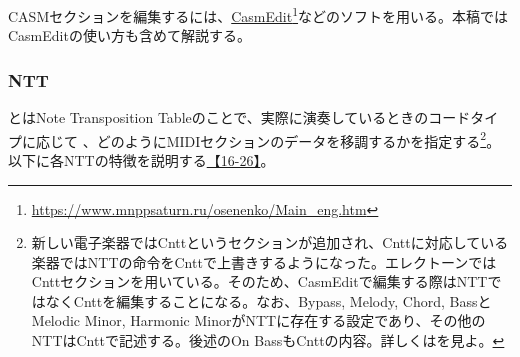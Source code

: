 \documentclass[uplatex, 10pt, dvipdfmx]{jsarticle}
\numberwithin{equation}{section}
\newcommand{\emphj}[1]{\textbf{\textrm{\textgt{{#1}}}}}
\begin{document}
CASMセクションを編集するには、\href{https://www.mnppsaturn.ru/osenenko/Main_eng.htm}{CasmEdit}\footnote{\url{https://www.mnppsaturn.ru/osenenko/Main_eng.htm}}などのソフトを用いる。本稿ではCasmEditの使い方も含めて解説する。

\subsubsection{NTT}
\emphj{NTT}とはNote Transposition Tableのことで、実際に演奏しているときのコードタイプに応じて
、どのようにMIDIセクションのデータを移調するかを指定する\footnote{新しい電子楽器ではCnttというセクションが追加され、Cnttに対応している楽器ではNTTの命令をCnttで上書きするようになった。エレクトーンではCnttセクションを用いている。そのため、CasmEditで編集する際はNTTではなくCnttを編集することになる。なお、Bypass, Melody, Chord, BassとMelodic Minor, Harmonic MinorがNTTに存在する設定であり、その他のNTTはCnttで記述する。後述のOn BassもCnttの内容。詳しくは\cite{style}を見よ。}。以下に各NTTの特徴を説明する\href{http://els01stylefile.music.coocan.jp/Stagea_Style/P1626.htm}{【16-26】}。
\end{document}
